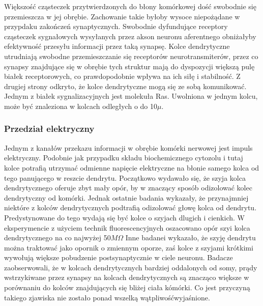 \documentclass{article}
\begin{document}
Większość cząsteczek przytwierdzonych do błony komórkowej dość swobodnie się przemieszcza w jej obrębie.
Zachowanie takie byłoby wysoce niepożądane w przypdaku zakończeń synaptycznych. 
Swobodnie dyfundujące receptory cząsteczek sygnałowych wysyłanych przez akson neuronu aferentnego obniżałyby efektywność przesyłu informacji przez taką synapsę. 
Kolce dendrytyczne utrudniają swobodne przemieszczanie się receptorów neurotransmiterów, przez co synapsy znajdujące się w obrębie tych struktur mają do dyspozycji większą pulę białek receptorowych, co prawdopodobnie wpływa na ich siłę i stabilność.
Z drugiej strony odkryto, że kolce dendrytyczne mogą się ze sobą komunikować.
Jednym z białek sygnalizacyjnych jest molekuła Ras.
Uwolniona w jednym kolcu, może być znaleziona w kolcach odległych o do 10\(\mu\).

\subsubsection{Przedział elektryczny}
Jednym z kanałów przekazu informacji w obrębie komórki nerwowej jest impuls elektryczny.
Podobnie jak przypadku składu biochemicznego cytozolu i tutaj kolce potrafią utrzymać odmienne napięcie elektryczne na błonie samego kolca od tego panującego w reszcie dendrytu.
Początkowo wydawało się, że szyja kolca dendrytycznego oferuje zbyt mały opór, by w znaczący sposób odizolować kolec dendrytyczny od komórki. 
Jednak ostatnie badania wykazały, że przynajmniej niektóre z kolców dendrytycznych podtrafią odizolować głowę kolca od dendrytu.
Predystynowane do tego wydają się być kolce o szyjach dlugich i cienkich.
W eksperymencie z użyciem technik fluorescencyjnych oszacowano opór szyi kolca dendrytycznego na co najwyżej 50\(M\Omega\)
Inne badanei wykazało, że szyję dendrytu można traktować jako opornik o zmiennym oporze, zaś kolce z szyjami krótkimi wywołują większe pobudzenie postsynaptycznie w ciele neuronu.
Badacze zaobserwowali, że w kolcach dendrytycznych bardziej oddalonych od somy, prądy wstrzykiwane przez synapsy na kolcach dendrytycznych są znacząco większe w porównaniu do kolców znajdujących się bliżej ciała kómórki.
Co jest przyczyną takiego zjawiska nie zostało ponad wszelką wątpliwośćwyjaśnione\citep{Sala2014}.
\end{document}
